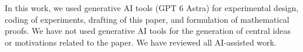 In this work, we used generative AI tools (GPT 6 Astra) for experimental design, coding of experiments, drafting of this paper, and formulation of mathematical proofs. We have not used generative AI tools for the generation of central ideas or motivations related to the paper. We have reviewed all AI-assisted work.
